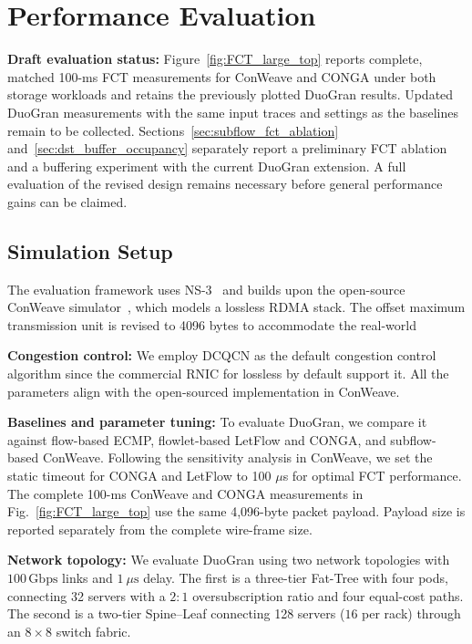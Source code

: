 \documentclass[10pt,journal,compsoc]{IEEEtran}
\newcounter{algorithm}
\begin{document}
\section{Performance Evaluation}
\noindent
\textbf{Draft evaluation status:} Figure~\ref{fig:FCT_large_top} reports complete, matched 100-ms FCT measurements for ConWeave and CONGA under both storage workloads and retains the previously plotted DuoGran results. Updated DuoGran measurements with the same input traces and settings as the baselines remain to be collected. Sections~\ref{sec:subflow_fct_ablation} and~\ref{sec:dst_buffer_occupancy} separately report a preliminary FCT ablation and a buffering experiment with the current DuoGran extension. A full evaluation of the revised design remains necessary before general performance gains can be claimed.


\subsection{Simulation Setup} 
The evaluation framework uses NS-3~\cite{ns3} and builds upon the open-source ConWeave simulator~\cite{Conweave}, which models a lossless RDMA stack. The offset maximum transmission unit is revised to 4096 bytes to accommodate the real-world 

\noindent
\textbf{Congestion control:} We employ DCQCN as the default congestion control algorithm since the commercial RNIC for lossless by default support it. All the parameters align with the open-sourced implementation in ConWeave.

\noindent
\textbf{Baselines and parameter tuning:} To evaluate DuoGran, we compare it against flow-based ECMP, flowlet-based LetFlow and CONGA, and subflow-based ConWeave. Following the sensitivity analysis in ConWeave, we set the static timeout for CONGA and LetFlow to 100 $\mu$s for optimal FCT performance. The complete 100-ms ConWeave and CONGA measurements in Fig.~\ref{fig:FCT_large_top} use the same 4,096-byte packet payload. Payload size is reported separately from the complete wire-frame size.

\noindent
\textbf{Network topology:} We evaluate DuoGran using two network topologies with $100\,\mathrm{Gbps}$ links and $1~\mu\mathrm{s}$ delay. The first is a three-tier Fat-Tree with four pods, connecting 32 servers with a $2{:}1$ oversubscription ratio and four equal-cost paths. The second is a two-tier Spine--Leaf connecting 128 servers ($16$ per rack) through an $8 \times 8$ switch fabric.
\end{document}
